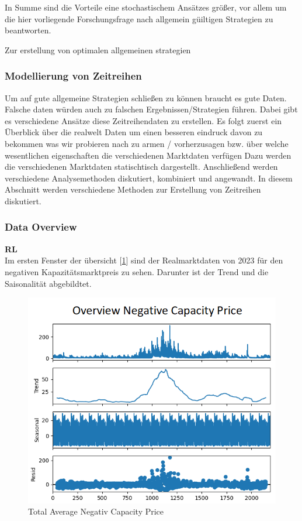 In Summe sind die Vorteile eine stochastischem Ansätzes größer, vor allem um die hier vorliegende Forschungsfrage nach allgemein güiltigen Strategien
zu beantworten.


Zur erstellung von optimalen allgemeinen strategien \\

\subsubsection{Modellierung von Zeitreihen}
Um auf gute allgemeine Strategien schließen zu können braucht es gute Daten. Falsche daten würden auch zu falschen Ergebnissen/Strategien führen.
Dabei gibt es verschiedene Ansätze diese Zeitreihendaten zu erstellen. Es folgt zuerst ein Überblick über die realwelt Daten um einen besseren eindruck
davon zu bekommen was wir probieren nach zu armen / vorherzusagen bzw. über welche wesentlichen eigenschaften die verschiedenen Marktdaten verfügen
Dazu werden die verschiedenen Marktdaten statischtisch dargestellt.
Anschließend werden verschiedene Analysemethoden diskutiert, kombiniert und angewandt.
In diesem Abschnitt werden verschiedene Methoden zur Erstellung von Zeitreihen diskutiert.
\subsubsection{Data Overview}
\textbf{RL}\\
Im ersten Fenster der übersicht [\ref{fig:Overview Average Negativ Capacity Price}] sind der Realmarktdaten von 2023 für den negativen Kapazitätsmarktpreis zu sehen.
Darunter ist der Trend und die Saisonalität abgebildtet.

\begin{figure}[!h]
	\includegraphics[width=1\linewidth]{pictures/capacityData_overview.png}
	\caption{Total Average Negativ Capacity Price}
	\label{fig:Overview Average Negativ Capacity Price}
\end{figure}

